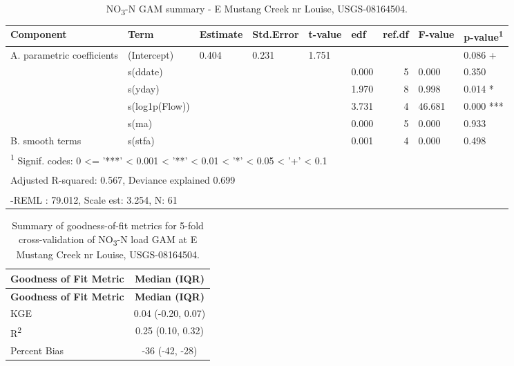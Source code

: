 \documentclass[
]{article}
\newenvironment{widestuff}{\begin{table}[h]\begin{adjustwidth}{-4.5cm}{-4.5cm}\centering}{\end{adjustwidth}\end{table}}
\begin{document}
\begin{widestuff}

\caption{NO\textsubscript{3}-N GAM summary - E Mustang Creek nr Louise, USGS-08164504.}
\centering
\begin{tabular}[t]{llllllrll}
\toprule
Component & Term & Estimate & Std.Error & t-value & edf & ref.df & F-value & p-value\textsuperscript{1}\\
\midrule
A. parametric coefficients & (Intercept) & 0.404 & 0.231 & 1.751 &  &  &  & 0.086 +\\
\cmidrule{1-9}
 & s(ddate) &  &  &  & 0.000 & 5 & 0.000 & 0.350\\

 & s(yday) &  &  &  & 1.970 & 8 & 0.998 & 0.014 *\\

 & s(log1p(Flow)) &  &  &  & 3.731 & 4 & 46.681 & 0.000 ***\\

 & s(ma) &  &  &  & 0.000 & 5 & 0.000 & 0.933\\

\multirow[t]{-5}{*}{\raggedright\arraybackslash B. smooth terms} & s(stfa) &  &  &  & 0.001 & 4 & 0.000 & 0.498\\
\bottomrule
\multicolumn{9}{l}{\textsuperscript{1} Signif. codes: 0 <= '***' < 0.001 < '**' < 0.01 < '*' < 0.05 < '+' < 0.1}\\
\multicolumn{9}{l}{\textsuperscript{} Adjusted R-squared: 0.567, Deviance explained 0.699}\\
\multicolumn{9}{l}{\textsuperscript{} -REML : 79.012, Scale est: 3.254, N: 61}\\
\end{tabular}
\end{widestuff}

\hypertarget{tbl-NO308164504-CV}{}
\begin{longtable}[]{@{}lc@{}}
\caption{\label{tbl-NO308164504-CV}Summary of goodness-of-fit metrics
for 5-fold cross-validation of NO\textsubscript{3}-N load GAM at E
Mustang Creek nr Louise, USGS-08164504.}\tabularnewline
\toprule()
\textbf{Goodness of Fit Metric} & \textbf{Median (IQR)} \\
\midrule()
\endfirsthead
\toprule()
\textbf{Goodness of Fit Metric} & \textbf{Median (IQR)} \\
\midrule()
\endhead
KGE & 0.04 (-0.20, 0.07) \\
R\textsuperscript{2} & 0.25 (0.10, 0.32) \\
Percent Bias & -36 (-42, -28) \\
\bottomrule()
\end{longtable}
\end{document}
